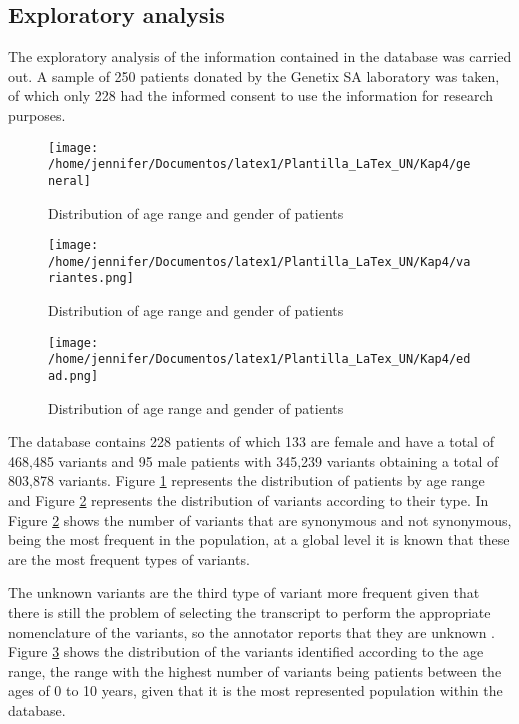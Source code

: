 \documentclass[twocolumn]{bmcart}%
\begin{document}
\subsection*{Exploratory analysis}
The exploratory analysis of the information contained in the database was carried out. A sample of 250 patients donated by the Genetix SA laboratory was taken, of which only 228 had the informed consent to use the information for research purposes.

\begin{figure}[h!]
	\centering
	\texttt{[image: /home/jennifer/Documentos/latex1/Plantilla\_LaTex\_UN/Kap4/general]}
	\caption{Distribution of age range and gender of patients}
	\label{fig:general}
\end{figure}

\begin{figure}[h!]
	\texttt{[image: /home/jennifer/Documentos/latex1/Plantilla\_LaTex\_UN/Kap4/variantes.png]}
	\caption{Distribution of age range and gender of patients}
	\label{f:generosgeneral}
\end{figure}

\begin{figure}[h!]
	\centering
	\texttt{[image: /home/jennifer/Documentos/latex1/Plantilla\_LaTex\_UN/Kap4/edad.png]}
	\caption{Distribution of age range and gender of patients}
	\label{f:variantesgeneral}
\end{figure}

The database contains 228 patients of which 133 are female and have a total of 468,485 variants and 95 male patients with 345,239 variants obtaining a total of 803,878 variants. Figure \ref{fig:general} represents the distribution of patients by age range and Figure \ref{f:generosgeneral} represents the distribution of variants according to their type. In Figure \ref{f:generosgeneral} shows the number of variants that are synonymous and not synonymous, being the most frequent in the population, at a global level it is known that these are the most frequent types of variants\cite{Fu2013}. 

The unknown variants are the third type of variant more frequent given that there is still the problem of selecting the transcript to perform the appropriate nomenclature of the variants, so the annotator reports that they are unknown \cite{McCarthy2014}. Figure \ref{f:variantesgeneral} shows the distribution of the variants identified according to the age range, the range with the highest number of variants being patients between the ages of 0 to 10 years, given that it is the most represented population within the database.
\end{document}
